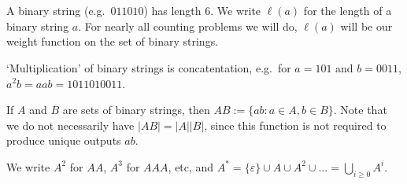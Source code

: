 \documentclass[12pt]{article}
\begin{document}
\section{}
A binary string (e.g.\ $011010$) has length 6. We write $\ell(a)$ for the length of a binary string $a$. For nearly all counting problems we will do, $\ell(a)$ will be our weight function on the set of binary strings.

`Multiplication' of binary strings is concatentation, e.g.\ for $a = 101$ and $b = 0011$, $a^2b = aab = 1011010011$.

If $A$ and $B$ are sets of binary strings, then $AB := \{ab: a \in A, b \in B\}$. Note that we do not necessarily have $|AB| = |A||B|$, since this function is not required to produce unique outputs $ab$.

We write $A^2$ for $AA$, $A^3$ for $AAA$, etc, and $A^* = \{\varepsilon\} \cup A \cup A^2 \cup \dots = \displaystyle\bigcup_{i\geq 0} A^i$.
\end{document}
